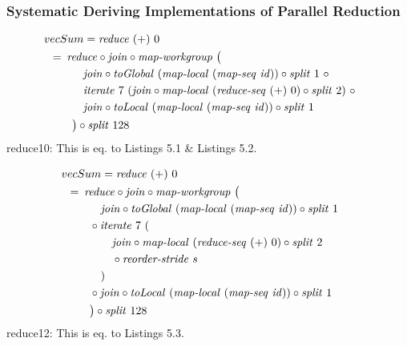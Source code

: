 \subsubsection{Systematic Deriving Implementations of Parallel Reduction}



\begin{align}
  &\hspace{-1.5em}vecSum = \reduce\ (+)\ 0\nonumber\\
  &\hspace{-2em}\quad\begin{aligned}
    &=\hspace{.2em}
      \reduce \circ \join \circ \mapWorkgroup\ \big(\\
    &\qquad\quad \join \circ \toGlobal\ (\mapLocal\ (\mapSeq\ \id)) \circ \splitN\ 1\ \circ\\
    &\qquad\quad\iterateN\ 7\ (\join \circ \mapLocal\ (\reduceSeq\ (+)\ 0) \circ \splitN\ 2)\ \circ\\
    &\qquad\quad \join \circ \toLocal\ (\mapLocal\ (\mapSeq\ \id)) \circ \splitN\ 1\\
    &\qquad\big) \circ \splitN\ 128
  \end{aligned}
\end{align}
reduce10: This is eq. to Listings 5.1 \& Listings 5.2.
















\begin{align}
  &\hspace{-1.5em}vecSum = \reduce\ (+)\ 0\nonumber\\
  &\hspace{-2em}\quad\begin{aligned}
    &=\hspace{.2em}
      \reduce \circ \join \circ \mapWorkgroup\ \big(\\
      &\qquad\quad \join \circ \toGlobal\ (\mapLocal\ (\mapSeq\ \id)) \circ \splitN\ 1\\
      &\qquad \circ \iterateN\ 7\ (\\
      &\qquad\qquad \join \circ \mapLocal\ (\reduceSeq\ (+)\ 0) \circ \splitN\ 2\\
      &\qquad\qquad \circ \reorderStride\ s\\
      &\qquad\quad)\\
      &\qquad \circ \join \circ \toLocal\ (\mapLocal\ (\mapSeq\ \id)) \circ \splitN\ 1\\
      &\qquad\big) \circ \splitN\ 128
  \end{aligned}
\end{align}
reduce12: This is eq. to Listings 5.3.













